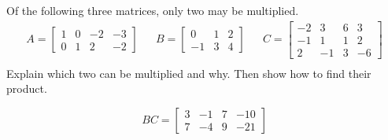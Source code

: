 
\begin{exerciseStatement}


Of the following three matrices, only two may be multiplied. 
\begin{align*} A= \left[\begin{array}{cccc}
1 & 0 & -2 & -3 \\
0 & 1 & 2 & -2
\end{array}\right]  & & B= \left[\begin{array}{ccc}
0 & 1 & 2 \\
-1 & 3 & 4
\end{array}\right]  & & C= \left[\begin{array}{cccc}
-2 & 3 & 6 & 3 \\
-1 & 1 & 1 & 2 \\
2 & -1 & 3 & -6
\end{array}\right]  \\ \end{align*}
             Explain which two can be multiplied and why. Then show how to find their product.


\end{exerciseStatement}
    
\begin{exerciseAnswer} 
\[BC= \left[\begin{array}{cccc}
3 & -1 & 7 & -10 \\
7 & -4 & 9 & -21
\end{array}\right] \]
\end{exerciseAnswer}
    
